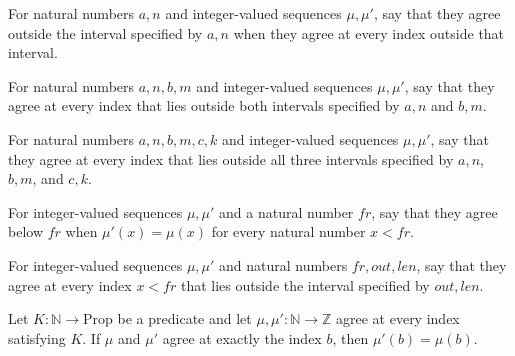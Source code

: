 \begin{definition}
\label{Light.SameOutside}
\leanok
{}
For natural numbers $a,n$ and integer-valued sequences $\mu,\mu'$, say that they agree
outside the interval specified by $a,n$ when they agree at every index outside that
interval.
\end{definition}

\begin{definition}
\label{Light.SameOutside2}
\leanok
{}
For natural numbers $a,n,b,m$ and integer-valued sequences $\mu,\mu'$, say that they
agree at every index that lies outside both intervals specified by $a,n$ and $b,m$.
\end{definition}

\begin{definition}
\label{Light.SameOutside3}
\leanok
{}
For natural numbers $a,n,b,m,c,k$ and integer-valued sequences $\mu,\mu'$, say that they
agree at every index that lies outside all three intervals specified by $a,n$, $b,m$,
and $c,k$.
\end{definition}

\begin{definition}
\label{Light.Kept}
\leanok
{}
For integer-valued sequences $\mu,\mu'$ and a natural number $fr$, say that they agree
below $fr$ when $\mu'(x)=\mu(x)$ for every natural number $x<fr$.
\end{definition}

\begin{definition}
\label{Light.KeptBut}
\leanok
{}
For integer-valued sequences $\mu,\mu'$ and natural numbers $fr,out,len$, say that they
agree at every index $x<fr$ that lies outside the interval specified by $out,len$.
\end{definition}

\begin{theorem}
\label{Light.SameOn.cell}
\leanok
{}
Let $K:\mathbb{N}\to\mathrm{Prop}$ be a predicate and let
$\mu,\mu':\mathbb{N}\to\mathbb{Z}$ agree at every index satisfying $K$. If $\mu$ and
$\mu'$ agree at exactly the index $b$, then $\mu'(b)=\mu(b)$.
\end{theorem}

